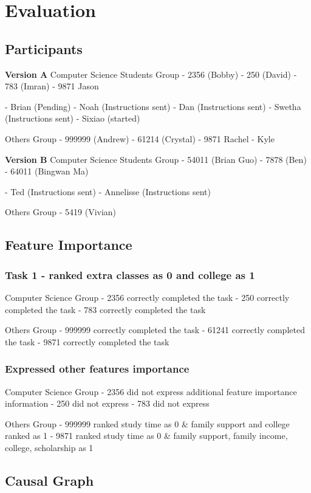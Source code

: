 \chapter{Evaluation} 
\section{Participants}
\textbf{ Version A }
Computer Science Students Group
- 2356 (Bobby)
- 250 (David)
- 783 (Imran)
- 9871 Jason 

- Brian (Pending)
- Noah (Instructions sent)
- Dan (Instructions sent)
- Swetha (Instructions sent)
- Sixiao (started)

Others Group
- 999999 (Andrew)
- 61214 (Crystal)
- 9871 Rachel 
- Kyle 

\textbf{ Version B }
Computer Science Students Group
- 54011 (Brian Guo)
- 7878 (Ben)
- 64011 (Bingwan Ma)

- Ted (Instructions sent)
- Annelisse (Instructions sent)

Others Group
- 5419 (Vivian)

\section{Feature Importance}
\subsection{ Task 1 - ranked extra classes as 0 and college as 1 }
Computer Science Group 
- 2356 correctly completed the task
- 250 correctly completed the task
- 783 correctly completed the task 


Others Group
- 999999 correctly completed the task
- 61241 correctly completed the task
- 9871 correctly completed the task 

\subsection{ Expressed other features importance }
Computer Science Group 
- 2356 did not express additional feature importance information
- 250 did not express
- 783 did not express 

Others Group
- 999999 ranked study time as 0 & family support and college ranked as 1
- 9871 ranked study time as 0 & family support, family income, college, scholarship as 1 


\section{Causal Graph}
